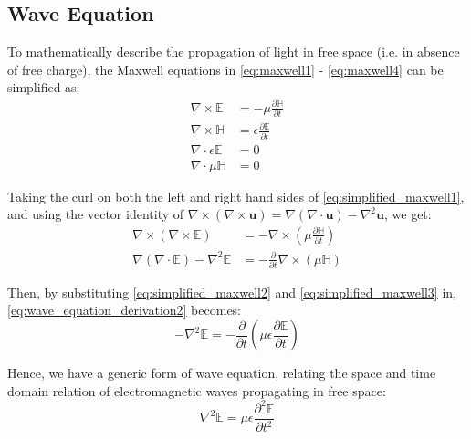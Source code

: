 \subsection{Wave Equation}
To mathematically describe the propagation of light in free space (i.e. in absence of free charge), the Maxwell equations in \cref{eq:maxwell1} - \cref{eq:maxwell4} can be simplified as:
\begin{align}
  \nabla \times \mathbb{E}         & = -\mu \frac{\partial \mathbb{H}}{\partial t}     \label{eq:simplified_maxwell1} \\
  \nabla \times \mathbb{H}         & = \epsilon \frac{\partial \mathbb{E}}{\partial t} \label{eq:simplified_maxwell2} \\
  \nabla \cdot \epsilon \mathbb{E} & = 0                                               \label{eq:simplified_maxwell3} \\
  \nabla \cdot \mu \mathbb{H}      & = 0 \label{eq:simplified_maxwell4}
\end{align}

Taking the curl on both the left and right hand sides of \cref{eq:simplified_maxwell1}, and using the vector identity of $\nabla \times (\nabla \times \textbf{u}) = \nabla(\nabla \cdot \textbf{u}) - \nabla^2 \textbf{u}$, we get:
\begin{align}
  \nabla \times (\nabla \times \mathbb{E})               & = -\nabla \times (\mu \frac{\partial \mathbb{H}}{\partial t}) \label{eq:wave_equation_derivation1} \\
  \nabla (\nabla \cdot \mathbb{E}) - \nabla^2 \mathbb{E} & = -\frac{\partial}{\partial t} \nabla \times (\mu \mathbb{H}) \label{eq:wave_equation_derivation2}
\end{align}

Then, by substituting \cref{eq:simplified_maxwell2} and \cref{eq:simplified_maxwell3} in, \cref{eq:wave_equation_derivation2} becomes:
\begin{equation}
  -\nabla^2 \mathbb{E} = -\frac{\partial}{\partial t} (\mu \epsilon \frac{\partial \mathbb{E}}{\partial t}) \label{eq:wave_equation_derivation3}
\end{equation}

Hence, we have a generic form of wave equation, relating the space and time domain relation of electromagnetic waves propagating in free space:
\begin{equation}
  \nabla^2 \mathbb{E} = \mu \epsilon \frac{\partial^2 \mathbb{E}}{\partial t^2} \label{eq:wave_equation}
\end{equation}

